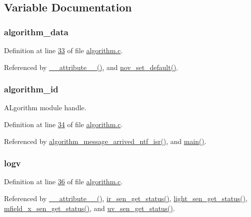 \subsection{Variable Documentation}
\hypertarget{a00038_a183caa40cd01e79ee309cc9c4a225197}{
\subsubsection[{algorithm\+\_\+data}]{ algorithm\+\_\+data}}\label{a00038_a183caa40cd01e79ee309cc9c4a225197}


Definition at line \hyperlink{a00038_source_l00033}{33} of file \hyperlink{a00038_source}{algorithm.\+c}.



Referenced by \hyperlink{a00041_source_l00025}{\+\_\+\+\_\+attribute\+\_\+\+\_\+()}, and \hyperlink{a00060_source_l00760}{nov\+\_\+set\+\_\+default()}.

\hypertarget{a00038_aff3e3d622fcd96787628167d3c1856f9}{
\subsubsection[{algorithm\+\_\+id}]{ algorithm\+\_\+id}}\label{a00038_aff3e3d622fcd96787628167d3c1856f9}


A\+Lgorithm module handle. 



Definition at line \hyperlink{a00038_source_l00034}{34} of file \hyperlink{a00038_source}{algorithm.\+c}.



Referenced by \hyperlink{a00038_source_l02104}{algorithm\+\_\+message\+\_\+arrived\+\_\+ntf\+\_\+isr()}, and \hyperlink{a00048_source_l00080}{main()}.

\hypertarget{a00038_a2e89c46668b39a17753c238950c9e1ec}{
\subsubsection[{logv}]{ logv}}\label{a00038_a2e89c46668b39a17753c238950c9e1ec}


Definition at line \hyperlink{a00038_source_l00036}{36} of file \hyperlink{a00038_source}{algorithm.\+c}.



Referenced by \hyperlink{a00041_source_l00025}{\+\_\+\+\_\+attribute\+\_\+\+\_\+()}, \hyperlink{a00045_source_l00302}{ir\+\_\+sen\+\_\+get\+\_\+status()}, \hyperlink{a00047_source_l00204}{light\+\_\+sen\+\_\+get\+\_\+status()}, \hyperlink{a00050_source_l00276}{mfield\+\_\+x\+\_\+sen\+\_\+get\+\_\+status()}, and \hyperlink{a00073_source_l00302}{uv\+\_\+sen\+\_\+get\+\_\+status()}.

